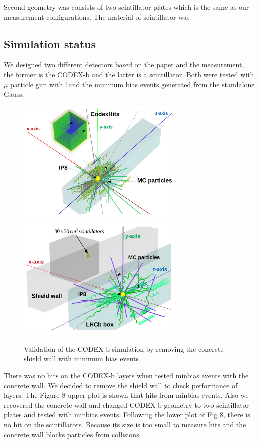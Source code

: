 Second geometry was consists of two scintillator plates which is the same as our measurement configurations.
The material of scintillator was  

\subsection{Simulation status}

We designed two different detectors based on the paper and the measurement, the former is the CODEX-b and the latter is a scintillator.
Both were tested with $\mu$ particle gun with 1\tev and the minimum bias events generated from the standalone Gauss. 

\begin{figure}[h]
\centering
    \includegraphics[width=8cm]{figs/INT/Minbias.pdf} \\
    \vspace{0.2cm} 
    \includegraphics[width=8cm]{figs/INT/Scint.pdf}
\caption{
    Validation of the CODEX-b simulation by removing the concrete shield wall with minimum bias events 
}
\end{figure}

There was no hits on the CODEX-b layers when tested minbias events with the concrete wall.
We decided to remove the shield wall to check performance of layers.
The Figure 8 upper plot is shown that hits from minbias events.
Also we recovered the concrete wall and changed CODEX-b geometry to two scintillator plates and tested with minbias events.
Following the lower plot of Fig 8, there is no hit on the scintillators.
Because its size is too small to measure hits and the concrete wall blocks particles from collisions.

